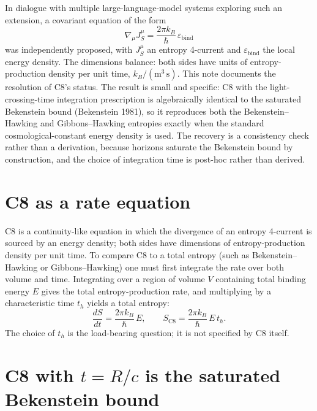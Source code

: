 \documentclass[11pt]{article}
\newcommand{\SC}{S_{\mathrm{C8}}}
\begin{document}
In dialogue with multiple large-language-model systems exploring such an extension, a covariant
equation of the form
\begin{equation}
  \nabla_{\mu} J_{S}^{\mu} = \frac{2\pi k_{B}}{\hbar}\,\varepsilon_{\mathrm{bind}}
  \tag{C8}
\end{equation}
was independently proposed, with $J_{S}^{\mu}$ an entropy 4-current and $\varepsilon_{\mathrm{bind}}$
the local energy density. The dimensions balance: both sides have units of entropy-production density
per unit time, $k_{B}/(\mathrm{m}^{3}\,\mathrm{s})$. This note documents the resolution of C8's status.
The result is small and specific: C8 with the light-crossing-time integration prescription is
algebraically identical to the saturated Bekenstein bound (Bekenstein 1981), so it reproduces both the
Bekenstein--Hawking and Gibbons--Hawking entropies exactly when the standard cosmological-constant
energy density is used. The recovery is a consistency check rather than a derivation, because horizons
saturate the Bekenstein bound by construction, and the choice of integration time is post-hoc rather
than derived.

\section{C8 as a rate equation}

C8 is a continuity-like equation in which the divergence of an entropy 4-current is sourced by an
energy density; both sides have dimensions of entropy-production density per unit time. To compare C8
to a total entropy (such as Bekenstein--Hawking or Gibbons--Hawking) one must first integrate the rate
over both volume and time. Integrating over a region of volume $V$ containing total binding energy $E$
gives the total entropy-production rate, and multiplying by a characteristic time $t_{h}$ yields a
total entropy:
\begin{equation}
  \frac{dS}{dt} = \frac{2\pi k_{B}}{\hbar}\,E,
  \qquad
  \SC = \frac{2\pi k_{B}}{\hbar}\,E\,t_{h}.
\end{equation}
The choice of $t_{h}$ is the load-bearing question; it is not specified by C8 itself.

\section{C8 with $t = R/c$ is the saturated Bekenstein bound}
\end{document}
